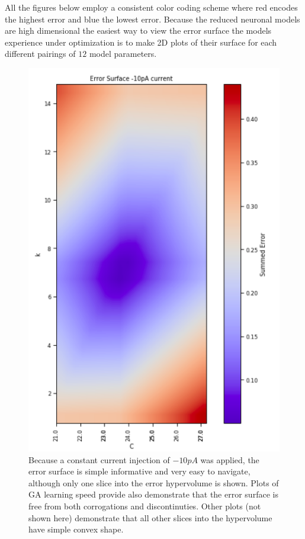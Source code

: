 All the figures below employ a consistent color coding scheme where red encodes the highest error and blue the lowest error. Because the reduced neuronal models are high dimensional the easiest way to view the error surface the models experience under optimization is to make 2D plots of their surface for each different pairings of $12$ model parameters.



\begin{figure}
    \centering
    \includegraphics[scale=0.7]{figures/friendly_error_surface.png}
    \caption[Using only constant currents causes simple tractable error surfaces]{Because a constant current injection of $-10pA$ was applied, the error surface is simple informative and very easy to navigate, although only one slice into the error hypervolume is shown. Plots of GA learning speed provide also demonstrate that the error surface is free from both corrogations and discontinuties. Other plots (not shown here) demonstrate that all other slices into the hypervolume have simple convex shape.}
    \label{fig:constant_current}
\end{figure}


